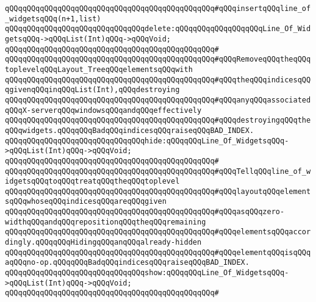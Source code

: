 \verb|qQQqqQQqqQQqqQQqqQQqqQQqqQQqqQQqqQQqqQQqqQQqqQQq#qQQqinsertqQQqline_of_widgetsqQQq(n+1,list)|\newline
\newline
\verb|qQQqqQQqqQQqqQQqqQQqqQQqqQQqqQQqdelete:qQQqqQQqqQQqqQQqqQQqLine_Of_WidgetsqQQq->qQQqList(Int)qQQq->qQQqVoid;|\newline
\verb|qQQqqQQqqQQqqQQqqQQqqQQqqQQqqQQqqQQqqQQqqQQqqQQq#|\newline
\verb|qQQqqQQqqQQqqQQqqQQqqQQqqQQqqQQqqQQqqQQqqQQqqQQq#qQQqRemoveqQQqtheqQQqtoplevelqQQqLayout_TreeqQQqelementsqQQqwith|\newline
\verb|qQQqqQQqqQQqqQQqqQQqqQQqqQQqqQQqqQQqqQQqqQQqqQQq#qQQqtheqQQqindicesqQQqgivenqQQqinqQQqList(Int),qQQqdestroying|\newline
\verb|qQQqqQQqqQQqqQQqqQQqqQQqqQQqqQQqqQQqqQQqqQQqqQQq#qQQqanyqQQqassociatedqQQqX-serverqQQqwindowsqQQqandqQQqeffectively|\newline
\verb|qQQqqQQqqQQqqQQqqQQqqQQqqQQqqQQqqQQqqQQqqQQqqQQq#qQQqdestroyingqQQqtheqQQqwidgets.qQQqqQQqBadqQQqindicesqQQqraiseqQQqBAD_INDEX.|\newline
\newline
\newline
\verb|qQQqqQQqqQQqqQQqqQQqqQQqqQQqqQQqhide:qQQqqQQqLine_Of_WidgetsqQQq->qQQqList(Int)qQQq->qQQqVoid;|\newline
\verb|qQQqqQQqqQQqqQQqqQQqqQQqqQQqqQQqqQQqqQQqqQQqqQQq#|\newline
\verb|qQQqqQQqqQQqqQQqqQQqqQQqqQQqqQQqqQQqqQQqqQQqqQQq#qQQqTellqQQqline_of_widgetsqQQqtoqQQqtreatqQQqtheqQQqtoplevel|\newline
\verb|qQQqqQQqqQQqqQQqqQQqqQQqqQQqqQQqqQQqqQQqqQQqqQQq#qQQqlayoutqQQqelementsqQQqwhoseqQQqindicesqQQqareqQQqgiven|\newline
\verb|qQQqqQQqqQQqqQQqqQQqqQQqqQQqqQQqqQQqqQQqqQQqqQQq#qQQqasqQQqzero-widthqQQqandqQQqrepositionqQQqtheqQQqremaining|\newline
\verb|qQQqqQQqqQQqqQQqqQQqqQQqqQQqqQQqqQQqqQQqqQQqqQQq#qQQqelementsqQQqaccordingly.qQQqqQQqHidingqQQqanqQQqalready-hidden|\newline
\verb|qQQqqQQqqQQqqQQqqQQqqQQqqQQqqQQqqQQqqQQqqQQqqQQq#qQQqelementqQQqisqQQqaqQQqno-op.qQQqqQQqBadqQQqindicesqQQqraiseqQQqBAD_INDEX.|\newline
\newline
\verb|qQQqqQQqqQQqqQQqqQQqqQQqqQQqqQQqshow:qQQqqQQqLine_Of_WidgetsqQQq->qQQqList(Int)qQQq->qQQqVoid;|\newline
\verb|qQQqqQQqqQQqqQQqqQQqqQQqqQQqqQQqqQQqqQQqqQQqqQQq#|\newline
